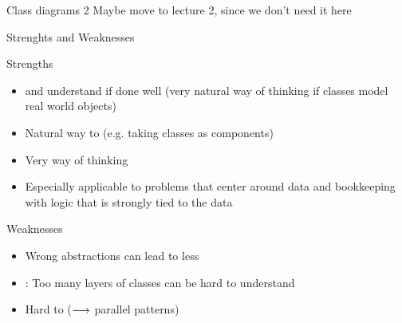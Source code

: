 \begin{frame}{Class diagrams 2}
	Maybe move to lecture 2, since we don't need it here
	
\end{frame}

\begin{frame}{Strenghts and Weaknesses}
		
\begin{block}{Strengths}
	
	\begin{itemize}
		\item {} and understand if done well (very natural way of thinking if classes model real world objects)
		\item Natural way to  (e.g. taking classes as components)
		\item Very  way of thinking
		\item Especially applicable to problems that center around data and bookkeeping with logic that is strongly tied to the data
	\end{itemize}
\end{block}
\begin{block}{Weaknesses}
\begin{itemize}
	\item Wrong abstractions can lead to less 
	\item {}: Too many layers of classes can be hard to understand
	\item Hard to  ($\longrightarrow$ parallel patterns)
\end{itemize}
\end{block}
\end{frame}